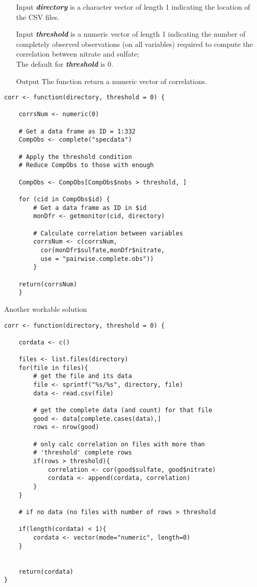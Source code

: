 \documentclass[]{article}
\begin{document}
\begin{itemize}
\item[Input] \textit{\textbf{directory}} is a character vector of length 1 indicating the
    location of the CSV files. 
\item[Input] \textit{\textbf{threshold}} is a numeric vector of length 1
   indicating the number of completely observed observations (on all variables) required to compute the correlation between nitrate and sulfate; \\ The default for \textit{\textbf{threshold}} is 0. 
\item[Output] The function return a numeric vector of correlations.
\end{itemize}    
\begin{framed}    
\begin{verbatim}
corr <- function(directory, threshold = 0) {

    corrsNum <- numeric(0)

    # Get a data frame as ID = 1:332
    CompObs <- complete("specdata")

    # Apply the threshold condition
    # Reduce CompObs to those with enough
    
    CompObs <- CompObs[CompObs$nobs > threshold, ]

    for (cid in CompObs$id) {
        # Get a data frame as ID in $id
        monDfr <- getmonitor(cid, directory)

        # Calculate correlation between variables
        corrsNum <- c(corrsNum, 
          cor(monDfr$sulfate,monDfr$nitrate, 
          use = "pairwise.complete.obs"))
        }

    return(corrsNum)
    }
\end{verbatim}
\end{framed}
\newpage
Another workable solution
\begin{verbatim}
corr <- function(directory, threshold = 0) {
  
    cordata <- c()

    files <- list.files(directory)
    for(file in files){
        # get the file and its data
        file <- sprintf("%s/%s", directory, file)
        data <- read.csv(file)

        # get the complete data (and count) for that file
        good <- data[complete.cases(data),]
        rows <- nrow(good)

        # only calc correlation on files with more than
        # 'threshold' complete rows
        if(rows > threshold){
            correlation <- cor(good$sulfate, good$nitrate)
            cordata <- append(cordata, correlation)
        }
    }

    # if no data (no files with number of rows > threshold
    
    if(length(cordata) < 1){
        cordata <- vector(mode="numeric", length=0)
    }

    
    return(cordata)
}
\end{verbatim}	
\end{document}
